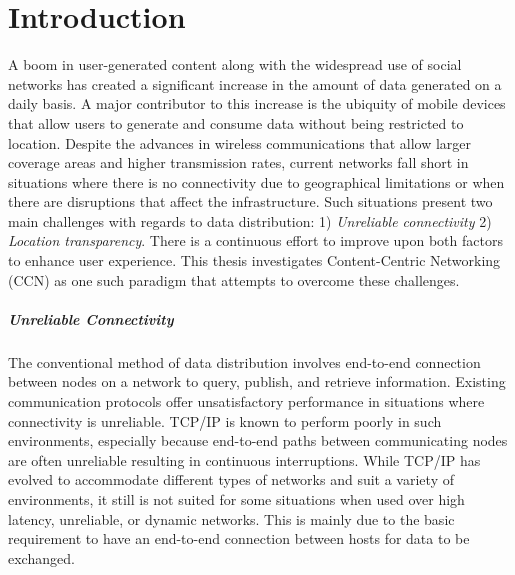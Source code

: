 \documentclass[a4paper,12pt]{report}      %
\begin{document}
%
% 
%
%

\tableofcontents



\pagebreak
\chapter{Introduction}
A boom in user-generated content along with the widespread use of social networks has created a significant increase in the amount of data generated on a daily basis. A major contributor to this increase is the ubiquity of mobile devices that allow users to generate and consume data without being restricted to location. Despite the advances in wireless communications that allow larger coverage areas and higher transmission rates, current networks fall short in situations where there is no connectivity due to geographical limitations or when there are disruptions that affect the infrastructure. Such situations present two main challenges with regards to data distribution: 1) \emph{Unreliable connectivity} 2) \emph{Location transparency}. There is a continuous effort to improve upon both factors to enhance user experience. This thesis investigates Content-Centric Networking (CCN) as one such paradigm that
attempts to overcome these challenges.

\paragraph{Unreliable Connectivity}
The conventional method of data distribution involves end-to-end connection between nodes on a network to query, publish, and retrieve information. Existing communication protocols offer unsatisfactory performance in situations where connectivity is unreliable. TCP/IP is known to perform poorly in such environments, especially because end-to-end paths between communicating nodes are often unreliable resulting in continuous interruptions\cite{tcpbreak}. 
While TCP/IP has evolved to accommodate different types of networks and suit a variety of environments, it still is not suited for some situations when used over high latency, unreliable, or dynamic networks. This is mainly due to the basic requirement to have an end-to-end connection between hosts for data to be exchanged.
\end{document}
